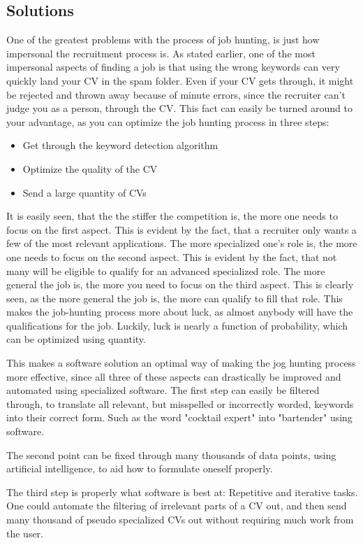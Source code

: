 \subsection{Solutions}
One of the greatest problems with the process of job hunting, is just how impersonal
the recruitment process is. As stated earlier, one of the most impersonal aspects
of finding a job is that using the wrong keywords can very
quickly land your CV in the spam folder.
Even if your CV gets through, it might be rejected and thrown away because of
minute errors, since the recruiter can't judge you as a person, through the CV.
This fact can easily be turned around to your advantage, as you can optimize the
job hunting process in three steps:   
\begin{itemize}
  \item Get through the keyword detection algorithm
  \item Optimize the quality of the CV
  \item Send a large quantity of CVs
\end{itemize}

It is easily seen, that the the stiffer the competition is, the more one 
needs to focus on the first aspect. This is evident by the fact, that a 
recruiter only wants a few of the most relevant applications.
The more specialized one's role is, the more one needs to focus on the second
aspect. This is evident by the fact, that not many will be eligible to qualify
for an advanced specialized role.
The more general the job is, the more you need to focus on the third
aspect. This is clearly seen, as the more general the job is, the more can 
qualify to fill that role. This makes the job-hunting process more about luck, 
as almost anybody will have the qualifications for the job.
Luckily, luck is nearly a function of probability, which can be optimized using
quantity.

This makes a software solution an optimal way of making the jog hunting process more effective,
since all three of these aspects can drastically be improved and automated
using specialized software. 
The first step can easily be filtered through, to translate all relevant, but
misspelled or incorrectly worded, keywords into their correct form. Such
as the word "cocktail expert" into "bartender" using software.

The second point can be fixed through many thousands of data points, using
artificial intelligence, to aid how to formulate oneself properly. 

The third step is properly what software is best at: Repetitive and iterative
tasks.
One could automate the filtering of irrelevant parts of a CV out, and then send
many thousand of pseudo specialized CVs out without requiring much work from the
user.

